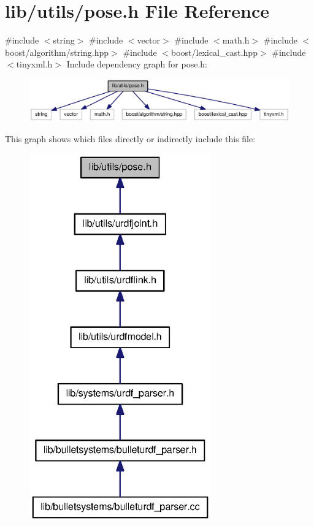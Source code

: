 \section{lib/utils/pose.h \-File \-Reference}
\label{pose_8h}
{\ttfamily \#include $<$string$>$}\*
{\ttfamily \#include $<$vector$>$}\*
{\ttfamily \#include $<$math.\-h$>$}\*
{\ttfamily \#include $<$boost/algorithm/string.\-hpp$>$}\*
{\ttfamily \#include $<$boost/lexical\-\_\-cast.\-hpp$>$}\*
{\ttfamily \#include $<$tinyxml.\-h$>$}\*
\-Include dependency graph for pose.\-h\-:\nopagebreak
\begin{figure}[H]
\begin{center}
\leavevmode
\includegraphics[width=350pt]{pose_8h__incl}
\end{center}
\end{figure}
\-This graph shows which files directly or indirectly include this file\-:
\nopagebreak
\begin{figure}[H]
\begin{center}
\leavevmode
\includegraphics[width=222pt]{pose_8h__dep__incl}
\end{center}
\end{figure}
